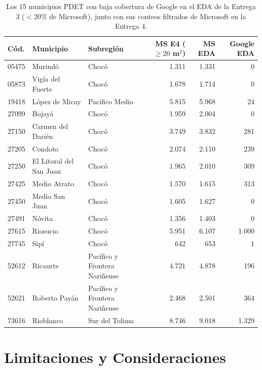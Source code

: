 \documentclass[11pt, a4paper]{article}
\begin{document}
\begin{table}[H]
\footnotesize
\setlength{\tabcolsep}{4.5pt}
\centering
\begin{tabular}{lp{3.2cm}p{3.8cm}rrr}
\toprule
\textbf{Cód.} & \textbf{Municipio} & \textbf{Subregión} & \textbf{MS E4 ($\ge 20$ m$^2$)} & \textbf{MS EDA} & \textbf{Google EDA} \\
\midrule
05475 & Murindó & Chocó & 1.311 & 1.331 & 0 \\
05873 & Vigía del Fuerte & Chocó & 1.678 & 1.714 & 0 \\
19418 & López de Micay & Pacífico Medio & 5.815 & 5.968 & 24 \\
27099 & Bojayá & Chocó & 1.959 & 2.004 & 0 \\
27150 & Carmen del Darién & Chocó & 3.749 & 3.832 & 281 \\
27205 & Condoto & Chocó & 2.074 & 2.110 & 239 \\
27250 & El Litoral del San Juan & Chocó & 1.965 & 2.010 & 309 \\
27425 & Medio Atrato & Chocó & 1.570 & 1.615 & 313 \\
27450 & Medio San Juan & Chocó & 1.605 & 1.627 & 0 \\
27491 & Nóvita & Chocó & 1.356 & 1.403 & 0 \\
27615 & Riosucio & Chocó & 5.951 & 6.107 & 1.000 \\
27745 & Sipí & Chocó & 642 & 653 & 1 \\
52612 & Ricaurte & Pacífico y Frontera Nariñense & 4.721 & 4.878 & 196 \\
52621 & Roberto Payán & Pacífico y Frontera Nariñense & 2.468 & 2.501 & 364 \\
73616 & Rioblanco & Sur del Tolima & 8.746 & 9.018 & 1.329 \\
\bottomrule
\end{tabular}
\caption{Los 15 municipios PDET con baja cobertura de Google en el EDA de la Entrega 3 ($< 20\%$ de Microsoft), junto con sus conteos filtrados de Microsoft en la Entrega 4.}
\label{tab:lowcov}
\end{table}

\section{Limitaciones y Consideraciones}
\end{document}
